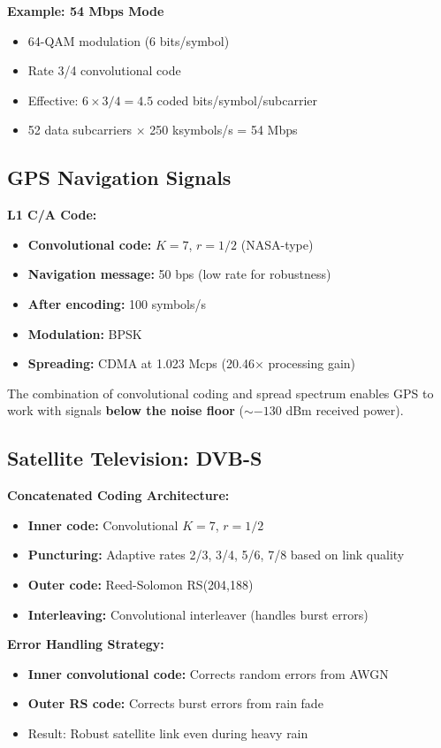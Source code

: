 \textbf{Example: 54 Mbps Mode}
\begin{itemize}
\item 64-QAM modulation (6 bits/symbol)
\item Rate 3/4 convolutional code
\item Effective: $6 \times 3/4 = 4.5$ coded bits/symbol/subcarrier
\item 52 data subcarriers $\times$ 250 ksymbols/s = 54 Mbps
\end{itemize}

\subsection{GPS Navigation Signals}

\textbf{L1 C/A Code:}
\begin{itemize}
\item \textbf{Convolutional code:} $K=7$, $r=1/2$ (NASA-type)
\item \textbf{Navigation message:} 50 bps (low rate for robustness)
\item \textbf{After encoding:} 100 symbols/s
\item \textbf{Modulation:} BPSK
\item \textbf{Spreading:} CDMA at 1.023 Mcps (20.46× processing gain)
\end{itemize}

The combination of convolutional coding and spread spectrum enables GPS to work with signals \textbf{below the noise floor} ($\sim -130$ dBm received power).

\subsection{Satellite Television: DVB-S}

\textbf{Concatenated Coding Architecture:}
\begin{itemize}
\item \textbf{Inner code:} Convolutional $K=7$, $r=1/2$
\item \textbf{Puncturing:} Adaptive rates 2/3, 3/4, 5/6, 7/8 based on link quality
\item \textbf{Outer code:} Reed-Solomon RS(204,188)
\item \textbf{Interleaving:} Convolutional interleaver (handles burst errors)
\end{itemize}

\textbf{Error Handling Strategy:}
\begin{itemize}
\item \textbf{Inner convolutional code:} Corrects random errors from AWGN
\item \textbf{Outer RS code:} Corrects burst errors from rain fade
\item Result: Robust satellite link even during heavy rain
\end{itemize}

